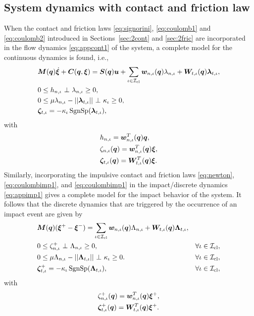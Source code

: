\documentclass[../DC2017114Bouma.tex]{subfiles}
\begin{document}
\subsection{System dynamics with contact and friction law}
When the contact and friction laws \eqref{eq:signorini}, \eqref{eq:coulomb1} and \eqref{eq:coulomb2} introduced in Sections~\ref{sec:2cont} and \ref{sec:2fric} are incorporated in the flow dynamics \eqref{eq:appcont1} of the system, a complete model for the continuous dynamics is found, i.e.,
\begin{align}
&\Mb(\qb)\dot{\xib} + \Cb(\qb,\xib) = \Sb(\qb)\ub + \sum_{\iota\in\Ic_{\text{cl}}}\wb_{n,\iota}(\qb)\lambda_{n,\iota} + \Wb_{t,\iota}(\qb)\lambdab_{t,\iota}, \label{eq:ncpcontact1}\\
&0\leq h_{n,\iota}\ \bot\ \lambda_{n,\iota} \geq 0,\label{eq:ncpcontact2}\\
&0\leq \mu\lambda_{n,\iota} - ||\lambdab_{t,\iota}||\ \bot\ \kappa_{\iota} \geq 0,\label{eq:ncpcontact3}\\
&\zetab_{t,\iota} = -\kappa_{\iota}\SgnSp(\lambdab_{t,\iota}),\label{eq:ncpcontact4}
\end{align}
with 
\begin{align}
&h_{n,\iota} = {\boldsymbol{w}}_{n,\iota}^T({\boldsymbol{q}}){\boldsymbol{q}},\label{eq:h}\\
&\zeta_{n,\iota}({\boldsymbol{q}}) = {\boldsymbol{w}}^T_{n,\iota}({\boldsymbol{q}}) \boldsymbol{\xi},  \label{eq:zetan}\\
&\boldsymbol{\zeta}_{t,\iota}({\boldsymbol{q}}) = {\boldsymbol{W}}^T_{t,\iota}({\boldsymbol{q}}) \boldsymbol{\xi}. \label{eq:zetab}
\end{align}
Similarly, incorporating the impulsive contact and friction laws \eqref{eq:newton}, \eqref{eq:coulombimp1}, and \eqref{eq:coulombimp1} in the impact/discrete dynamics \eqref{eq:appimp1} gives a complete model for the impact behavior of the system. It follows that the discrete dynamics that are triggered by the occurrence of an impact event are given by
\begin{align}
&\Mb(\qb)(\xib^+ - \xib^-) = \sum_{\iota\in\Ic_{\text{cl}}} \wb_{n,\iota}(\qb)\Lambda_{n,\iota} + \Wb_{t,\iota}(\qb)\Lambdab_{t,\iota}, \label{eq:ncpimpact1}\\
&0\leq \zeta_{n,\iota}^+\ \bot\ \Lambda_{n,\iota} \geq 0, &\forall \iota\in\Ic_{\text{cl}},\label{eq:ncpimpact2}\\
&0 \leq \mu\Lambda_{n,\iota} - ||\Lambdab_{t,\iota}||\ \bot\ \kappa_{\iota} \geq 0. &\forall \iota\in\Ic_{\text{cl}},\label{eq:ncpimpact3}\\
&\zetab_{t,\iota}^+ = -\kappa_{\iota}\SgnSp(\Lambdab_{t,\iota}), &\forall \iota\in\Ic_{\text{cl}},\label{eq:ncpimpact4}
\end{align}
with 
\begin{align}
&\zeta^+_{n,\iota}({\boldsymbol{q}}) = {\boldsymbol{w}}^T_{n,\iota}({\boldsymbol{q}}) \boldsymbol{\xi}^+,\\
&\boldsymbol{\zeta}^+_{t,\iota}({\boldsymbol{q}}) = {\boldsymbol{W}}^T_{t,\iota}({\boldsymbol{q}}) \boldsymbol{\xi}^+.\label{eq:ncpimpactend}
\end{align}
\end{document}
